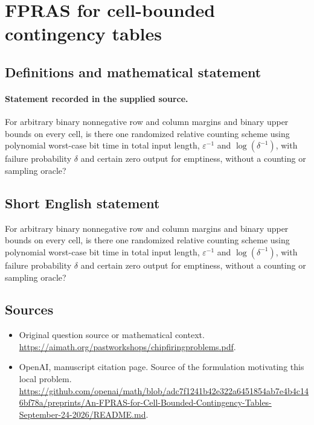 \documentclass[11pt]{article}
\begin{document}
\section*{FPRAS for cell-bounded contingency tables}\label{statement}
\subsection{Definitions and mathematical statement}
\paragraph{Statement recorded in the supplied source.}
For arbitrary binary nonnegative row and column margins and binary upper bounds on every cell, is there one randomized relative counting scheme using polynomial worst-case bit time in total input length, $\varepsilon ^{-1}$ and $\log (\delta ^{-1})$, with failure probability $\delta $ and certain zero output for emptiness, without a counting or sampling oracle?
\subsection{Short English statement}
For arbitrary binary nonnegative row and column margins and binary upper bounds on every cell, is there one randomized relative counting scheme using polynomial worst-case bit time in total input length, $\varepsilon ^{-1}$ and $\log (\delta ^{-1})$, with failure probability $\delta $ and certain zero output for emptiness, without a counting or sampling oracle?
\subsection{Sources}
\begin{itemize}
\item[S1] Original question source or mathematical context.
\url{https://aimath.org/pastworkshops/chipfiringproblems.pdf}.
\item[S2] OpenAI, manuscript citation page. Source of the formulation motivating this local problem.
\url{https://github.com/openai/math/blob/adc7f1241b42e322a6451854ab7e4b4c146bf78a/preprints/An-FPRAS-for-Cell-Bounded-Contingency-Tables-September-24-2026/README.md}.
\end{itemize}
\end{document}
